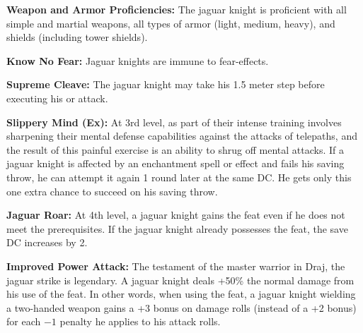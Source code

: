 {
\textbf{Weapon and Armor Proficiencies:} The jaguar knight is proficient with all simple and martial weapons, all types of armor (light, medium, heavy), and shields (including tower shields).

\textbf{Know No Fear:} Jaguar knights are immune to fear-effects.

\textbf{Supreme Cleave:} The jaguar knight may take his 1.5 meter step before executing his  or  attack.

\textbf{Slippery Mind (Ex):} At 3rd level, as part of their intense training involves sharpening their mental defense capabilities against the attacks of telepaths, and the result of this painful exercise is an ability to shrug off mental attacks. If a jaguar knight is affected by an enchantment spell or effect and fails his saving throw, he can attempt it again 1 round later at the same DC. He gets only this one extra chance to succeed on his saving throw.

\textbf{Jaguar Roar:} At 4th level, a jaguar knight gains the  feat even if he does not meet the prerequisites. If the jaguar knight already possesses the  feat, the save DC increases by 2.

\textbf{Improved Power Attack:} The testament of the master warrior in Draj, the jaguar strike is legendary. A jaguar knight deals +50\% the normal damage from his use of the  feat. In other words, when using the  feat, a jaguar knight wielding a two-handed weapon gains a +3 bonus on damage rolls (instead of a +2 bonus) for each $-1$ penalty he applies to his attack rolls.
}
